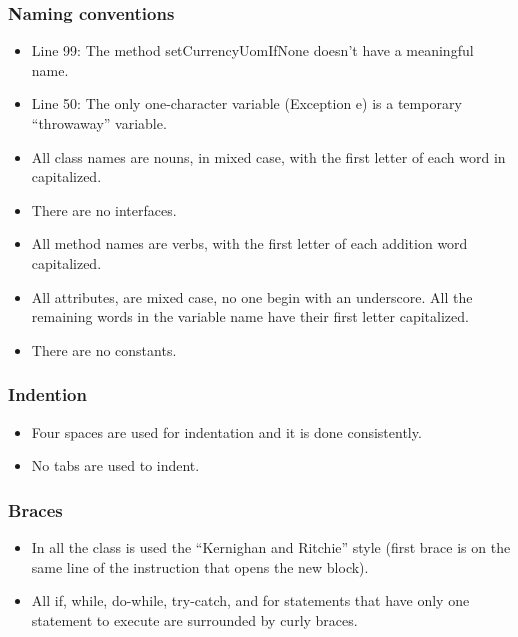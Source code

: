 
\subsubsection{Naming conventions}
\begin{itemize}

\item Line 99:  The method setCurrencyUomIfNone doesn't have a meaningful name. 
 
\item Line 50: The only one-character variable (Exception e) is a temporary
“throwaway” variable.

\item All class names are nouns, in mixed case, with the first letter of each word
in capitalized.

\item There are no interfaces.

\item All method names are verbs, with the first letter of each addition
word capitalized.

\item All attributes, are mixed case, no one begin
with an underscore. All the
remaining words in the variable name have their first letter capitalized.
 
 
 \item There are no constants.
\end{itemize}

\subsubsection{Indention}
\begin{itemize}
\item Four spaces are used for indentation and it is done consistently. 
\item No tabs are used to indent.
\end{itemize}

\subsubsection{Braces}
\begin{itemize}
\item In all the class is used the “Kernighan and
Ritchie” style (first brace is on the same line of the instruction that
opens the new block).

\item All if, while, do-while, try-catch, and for statements that have
only one statement to execute are surrounded by curly braces. 

\end{itemize}

